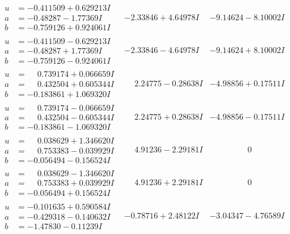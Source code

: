 \documentclass[1p]{elsarticle_modified}
\theoremstyle{definition}
\begin{document}
$$\begin{array}{c|c|c}
\begin{aligned}
u &= -0.411509 + 0.629213 I \\
a &= -0.48287 - 1.77369 I \\
b &= -0.759126 + 0.924061 I\end{aligned}
 & -2.33846 + 4.64978 I & -9.14624 - 8.10002 I \\ \hline\begin{aligned}
u &= -0.411509 - 0.629213 I \\
a &= -0.48287 + 1.77369 I \\
b &= -0.759126 - 0.924061 I\end{aligned}
 & -2.33846 - 4.64978 I & -9.14624 + 8.10002 I \\ \hline\begin{aligned}
u &= \phantom{-}0.739174 + 0.066659 I \\
a &= \phantom{-}0.432504 + 0.605344 I \\
b &= -0.183861 + 1.069320 I\end{aligned}
 & \phantom{-}2.24775 - 0.28638 I & -4.98856 + 0.17511 I \\ \hline\begin{aligned}
u &= \phantom{-}0.739174 - 0.066659 I \\
a &= \phantom{-}0.432504 - 0.605344 I \\
b &= -0.183861 - 1.069320 I\end{aligned}
 & \phantom{-}2.24775 + 0.28638 I & -4.98856 - 0.17511 I \\ \hline\begin{aligned}
u &= \phantom{-}0.038629 + 1.346620 I \\
a &= \phantom{-}0.753383 - 0.039929 I \\
b &= -0.056494 - 0.156524 I\end{aligned}
 & \phantom{-}4.91236 - 2.29181 I & \phantom{-0.000000 } 0 \\ \hline\begin{aligned}
u &= \phantom{-}0.038629 - 1.346620 I \\
a &= \phantom{-}0.753383 + 0.039929 I \\
b &= -0.056494 + 0.156524 I\end{aligned}
 & \phantom{-}4.91236 + 2.29181 I & \phantom{-0.000000 } 0 \\ \hline\begin{aligned}
u &= -0.101635 + 0.590584 I \\
a &= -0.429318 - 0.140632 I \\
b &= -1.47830 - 0.11239 I\end{aligned}
 & -0.78716 + 2.48122 I & -3.04347 - 4.76589 I \\ \hline\begin{aligned}

\end{aligned}
\end{array}$$
\end{document}
